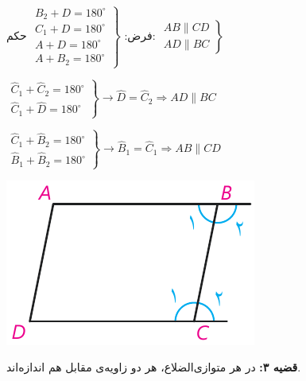 \documentclass[12pt, a4paper]{book}
\begin{document}
\begin{minipage}{.7\textwidth}
	\centering فرض: 
	$\left.
	\begin{array}{rrr}
		B_2 + D =180^{\circ} \\
		C_1 + D =180^{\circ} \\
		A + D = 180^{\circ} \\
		A + B_2 = 180^{\circ}
	\end{array}
	\right\}$
	\qquad حکم:
	$ \left. 
	\begin{array}{rrr}
		AB \parallel CD \\
		AD \parallel BC
	\end{array}
 \right\}$
	\begin{flushleft}
		$ \left.
		\begin{array}{rrr} 
			\widehat{C}_1 + \widehat{C}_2 = 180^{\circ} \\
			\widehat{C}_1 + \widehat{D} = 180^{\circ}
		\end{array}
	 \right\}
	  \rightarrow \widehat{D} = \widehat{C}_2 \Rightarrow AD \parallel BC$
	  
	  $\left.
	  \begin{array}{rrr} 
	  	\widehat{C}_1 + \widehat{B}_2 = 180^{\circ} \\
	  	\widehat{B}_1 + \widehat{B}_2 = 180^{\circ}
	  \end{array}
	  \right\}
	  \rightarrow \widehat{B}_1 = \widehat{C}_1 \Rightarrow AB \parallel CD$
	\end{flushleft}
\end{minipage}
\begin{minipage}{.28\textwidth}
	\begin{flushleft}
		\includegraphics{"Shapes/Fasl - 3/Dars 1/qazie 2.pdf"}
	\end{flushleft}
\end{minipage}
\newline \bigskip \bigskip

\textbf{قضیه ۳:} در هر متوازی‌الضلاع، هر دو زاویه‌ی مقابل هم اندازه‌اند.
\end{document}
